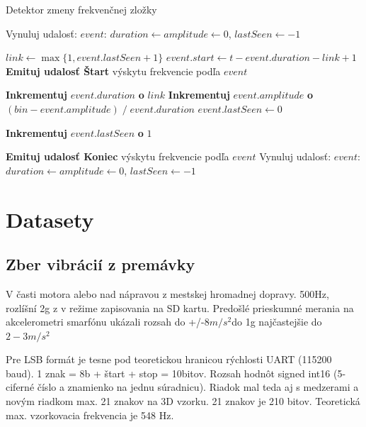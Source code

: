 \begin{algorithm}[h]
\caption{Detektor zmeny frekvenčnej zložky}
\begin{algorithmic}[1]
	\State Vynuluj udalosť: $event$: $duration \gets amplitude \gets 0$, $lastSeen \gets -1$
\EndIf

	\State $link \gets \max\{1, event.lastSeen + 1\}$
		\State $event.start \gets t - event.duration - link + 1$
		\State \textbf{Emituj udalosť Štart} výskytu frekvencie podľa $event$
	\EndIf
	
	\State \textbf{Inkrementuj} $event.duration$ \textbf{o} $link$
	\State \textbf{Inkrementuj} $event.amplitude$ \textbf{o} $(bin - event.amplitude)\;/\;event.duration$
	\State $event.lastSeen \gets 0$

	\State \textbf{Inkrementuj} $event.lastSeen$ \textbf{o}  $1$

        		\State \textbf{Emituj udalosť Koniec} výskytu frekvencie podľa $event$
        	\EndIf
        \Else
        	\State Vynuluj udalosť: $event$: $duration \gets amplitude \gets 0$, $lastSeen \gets -1$
        \EndIf
\EndIf
\end{algorithmic}
\label{algo:event-detector}
\end{algorithm}

\section{Datasety}
\subsection{Zber vibrácií z premávky}
V časti motora alebo nad nápravou z mestskej hromadnej dopravy. 500Hz, rozlíšní 2g z v režime zapisovania na SD kartu.
Predošlé prieskumné merania na akcelerometri smarfónu ukázali rozsah do +/-$8 m/s^2$do 1g najčastejšie do $2 - 3 m/s^2$

Pre LSB formát je tesne pod teoretickou hranicou rýchlosti UART (115200 baud). 1 znak = 8b + štart + stop = 10bitov.
Rozsah hodnôt signed int16 (5-ciferné číslo a znamienko na jednu súradnicu). Riadok mal teda aj s medzerami a novým riadkom max.
21 znakov na 3D vzorku. 21 znakov je 210 bitov. Teoretická max. vzorkovacia frekvencia je 548 Hz.

